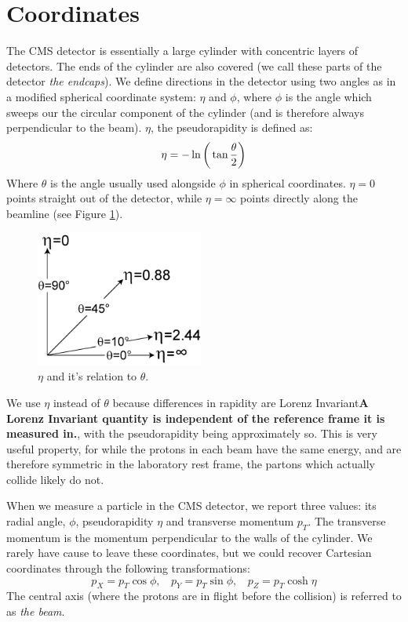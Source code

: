 \section{Coordinates}
The CMS detector is essentially a large cylinder with concentric layers of detectors. The ends of the cylinder are also covered (we call these parts of the detector \textit{the endcaps}). We define directions in the detector using two angles as in a modified spherical coordinate system: $\eta$ and $\phi$, where $\phi$ is the angle which sweeps our the circular component of the cylinder (and is therefore always perpendicular to the beam). $\eta$, the pseudorapidity is defined as:
\begin{equation}
    \eta = -\ln\bigg{(}\tan\frac{\theta}{2}\bigg{)}
\end{equation}
Where $\theta$ is the angle usually used alongside $\phi$ in spherical coordinates. $\eta = 0$ points straight out of the detector, while $\eta = \infty$ points directly along the beamline (see Figure \ref{Fig:CMS:eta}).
\begin{figure}[h!]
    \centering
        \includegraphics[width=0.49\textwidth]{F3/Pseudorapidity2}
        \caption{$\eta$ and it's relation to $\theta$.}
        \label{Fig:CMS:eta}
\end{figure}
We use $\eta$ instead of $\theta$ because differences in rapidity are Lorenz Invariant\textbf{A Lorenz Invariant quantity is independent of the reference frame it is measured in.}, with the pseudorapidity being approximately so. This is very useful property, for while the protons in each beam have the same energy, and are therefore symmetric in the laboratory rest frame, the partons which actually collide likely do not.

When we measure a particle in the CMS detector, we report three values: its radial angle, $\phi$, pseudorapidity $\eta$ and transverse momentum $p_{T}$. The transverse momentum is the momentum perpendicular to the walls of the cylinder. We rarely have cause to leave these coordinates, but we could recover Cartesian coordinates through the following transformations:
\begin{equation}
p_X = p_T\cos\phi, \ \ \ \ 
p_Y = p_T\sin\phi, \ \ \ \
p_Z = p_T\cosh\eta
\end{equation}
The central axis (where the protons are in flight before the collision) is referred to as \textit{the beam}.

